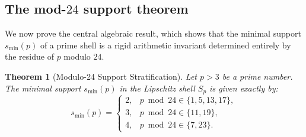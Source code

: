 \documentclass[11pt,a4paper]{article}
\newtheorem{theorem}{Theorem}[section]
\theoremstyle{definition}
\begin{document}
	\subsection{The mod-$24$ support theorem}
	We now prove the central algebraic result, which shows that the minimal support $s_{\min}(p)$ of a prime shell is a rigid arithmetic invariant determined entirely by the residue of $p$ modulo $24$.
	
	\begin{theorem}[Modulo-24 Support Stratification]
		\label{thm:mod24_support}
		Let $p > 3$ be a prime number. The minimal support $s_{\min}(p)$ in the Lipschitz shell $S_p$ is given exactly by:
		\begin{equation}
			s_{\min}(p) = 
			\begin{cases} 
				2, & p \bmod 24 \in \{1, 5, 13, 17\}, \\ 
				3, & p \bmod 24 \in \{11, 19\}, \\ 
				4, & p \bmod 24 \in \{7, 23\}. 
			\end{cases}
		\end{equation}
	\end{theorem}
	
\end{document}
